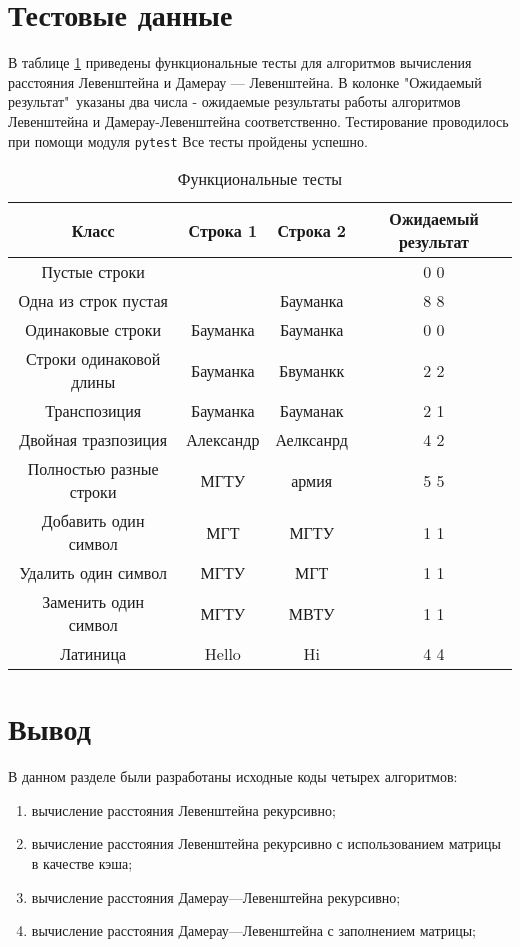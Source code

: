 \section{Тестовые данные}

В таблице \ref{tabular:functional_test} приведены функциональные тесты для алгоритмов вычисления расстояния Левенштейна и Дамерау — Левенштейна. В колонке "Ожидаемый результат"\ указаны два числа - ожидаемые результаты работы алгоритмов Левенштейна и Дамерау-Левенштейна соответственно. Тестирование проводилось при помощи модуля \texttt{pytest}\cite{pytest} Все тесты пройдены успешно.

\begin{table}[ht]
	\begin{center}
		\caption{\label{tabular:functional_test} Функциональные тесты}
		\begin{tabular}{|c|c|c|c|} 
			\hline
			\bfseries Класс & \bfseries Строка 1  & \bfseries Строка 2 &  \bfseries Ожидаемый результат \\
			\hline
			Пустые строки & &  & 0 0 \\
			\hline
			Одна из строк пустая & & Бауманка & 8 8\\
            \hline
            Одинаковые строки &Бауманка & Бауманка & 0 0\\
            \hline
            Строки одинаковой длины &Бауманка & Бвуманкк & 2 2\\
            \hline
            Транспозиция&Бауманка & Бауманак & 2 1\\
            \hline
            Двойная тразпозиция & Александр & Аелксанрд & 4 2 \\
            \hline
            Полностью разные строки&МГТУ & армия & 5 5 \\
            \hline
            Добавить один символ&МГТ & МГТУ & 1 1 \\
            \hline
            Удалить один символ&МГТУ & МГТ & 1 1 \\
            \hline
            Заменить один символ&МГТУ & МВТУ & 1 1 \\
			\hline
			Латиница&Hello & Hi & 4 4 \\
			\hline
		\end{tabular}
	\end{center}
\end{table}

\section{Вывод}
В данном разделе были разработаны исходные коды четырех алгоритмов: \begin{enumerate}
  	\item вычисление расстояния Левенштейна рекурсивно;
  	\item вычисление расстояния Левенштейна рекурсивно с использованием матрицы в качестве кэша;
	\item вычисление расстояния Дамерау—Левенштейна рекурсивно;
	\item вычисление расстояния Дамерау—Левенштейна с заполнением матрицы;
\end{enumerate}
